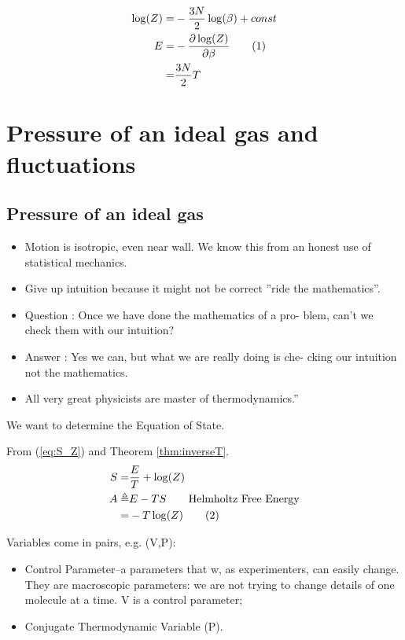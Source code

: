 \documentclass[]{article}
\newcommand\numberthis{\addtocounter{equation}{1}\tag{\theequation}}
\begin{document}
\begin{align*}
\log(Z) =& - \frac{3N}{2} \log(\beta) + const\\
E =& - \frac{\partial \log(Z)}{\partial \beta}\numberthis \label{eq:E:Z}\\
=& \frac{3N}{2} T
\end{align*}


\section{Pressure of an ideal gas and fluctuations}

\subsection{Pressure of an ideal gas}

\begin{itemize}
	\item Motion is isotropic, even near wall. We know this from an honest use of statistical mechanics.
	\item Give up intuition because it might not be correct ''ride the mathematics''.
	\item Question : Once we have done the mathematics of a pro-
	blem, can’t we check them with our intuition?
	\item Answer : Yes we can, but what we are really doing is che-
	cking our intuition not the mathematics.
	\item All very great physicists are master of thermodynamics.''
\end{itemize}

We want to determine the Equation of State.

From (\ref{eq:S_Z}) and Theorem \ref{thm:inverseT}.
\begin{align*}
S =& \frac{E}{T} + \log(Z)\\
A\triangleq &E - TS\tag*{Helmholtz Free Energy} \\
=& -T \log(Z) \numberthis \label{eq:helmholtz}
\end{align*}



Variables come in pairs, e.g. (V,P):
\begin{itemize}
	\item Control Parameter--a parameters that w, as experimenters, can easily change. They are macroscopic parameters: we are not trying to change details of one molecule at a time. V is a control parameter;
	\item Conjugate Thermodynamic Variable (P).
\end{itemize}
\end{document}
